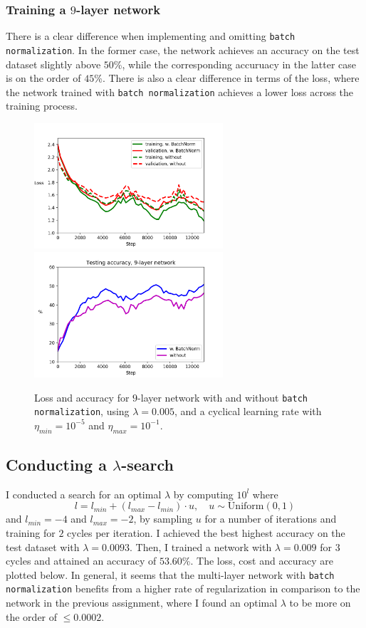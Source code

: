 \documentclass{article}
\begin{document}
\subsubsection*{Training a $9$-layer network}
	There is a clear difference when implementing and omitting \texttt{batch normalization}. In the former case, the network achieves an accuracy on the test dataset slightly above $50$\%, while the corresponding accuruacy in the latter case is on the order of $45$\%. There is also a clear difference in terms of the loss, where the network trained with \texttt{batch normalization} achieves a lower loss across the training process.
	\begin{figure}[h!]
		\centering
		\includegraphics[width=7cm]{../plots/loss_comp_9layer.png}
		\includegraphics[width=7cm]{../plots/acc_comp_9layer.png}
		\caption{Loss and accuracy for $9$-layer network with and without \texttt{batch normalization}, using $\lambda=0.005$, and a cyclical learning rate with $\eta_{min} = 10^{-5}$ and $\eta_{max} = 10^{-1}$.}
	\end{figure}

\newpage
\subsection*{Conducting a $\lambda$-search}
	I conducted a search for an optimal $\lambda$ by computing $10^l$ where
	$$l = l_{min} + (l_{max} - l_{min}) \cdot u, \quad u\sim\text{Uniform}(0, 1)$$
	and $l_{min} = -4$ and $l_{max} = -2$, by sampling $u$ for a number of iterations and training for $2$ cycles per iteration. I achieved the best highest accuracy on the test dataset with $\lambda = 0.0093$. Then, I trained a network with $\lambda = 0.009$ for $3$ cycles and attained an accuracy of $53.60$\%. The loss, cost and accuracy are plotted below. In general, it seems that the multi-layer network with \texttt{batch normalization} benefits from a higher rate of regularization in comparison to the network in the previous assignment, where I found an optimal $\lambda$ to be more on the order of $\leq 0.0002$.
\end{document}
